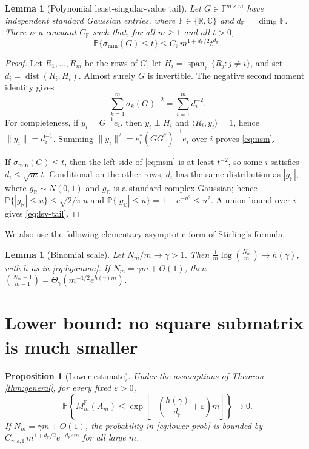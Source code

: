 \documentclass[preprint,12pt]{elsarticle}
\newtheorem{proposition}[theorem]{Proposition}
\newtheorem{lemma}[theorem]{Lemma}
\DeclareMathOperator{\dist}{dist}
\newcommand{\R}{\mathbb{R}}
\newcommand{\C}{\mathbb{C}}
\newcommand{\F}{\mathbb{F}}
\newcommand{\PP}{\mathbb{P}}
\begin{document}
\begin{lemma}[Polynomial least-singular-value tail]\label{lem:lsv-tail}
Let $G\in\F^{m\times m}$ have independent standard Gaussian entries, where $\F\in\{\R,\C\}$ and
$d_\F=\dim_\R\F$. There is a constant $C_\F$ such that, for all $m\ge1$ and all $t>0$,
\begin{equation}\label{eq:lsv-tail}
  \PP\{\sigma_{\min}(G)\le t\}\le C_\F m^{1+d_\F/2}t^{d_\F}.
\end{equation}
\end{lemma}

\begin{proof}
Let $R_1,\ldots,R_m$ be the rows of $G$, let $H_i=\operatorname{span}_\F\{R_j:j\ne i\}$, and set
$d_i=\dist(R_i,H_i)$. Almost surely $G$ is invertible. The negative second moment identity gives
\begin{equation}\label{eq:nsm}
  \sum_{k=1}^m \sigma_k(G)^{-2}=\sum_{i=1}^m d_i^{-2}.
\end{equation}
For completeness, if $y_i=G^{-1}e_i$, then $y_i\perp H_i$ and $\langle R_i,y_i\rangle=1$, hence
$\|y_i\|=d_i^{-1}$. Summing $\|y_i\|^2=e_i^*(GG^*)^{-1}e_i$ over $i$ proves \eqref{eq:nsm}.

If $\sigma_{\min}(G)\le t$, then the left side of \eqref{eq:nsm} is at least $t^{-2}$, so some $i$
satisfies $d_i\le \sqrt m\,t$. Conditional on the other rows, $d_i$ has the same distribution as
$|g_\F|$, where $g_\R\sim N(0,1)$ and $g_\C$ is a standard complex Gaussian; hence
$\PP\{|g_\R|\le u\}\le \sqrt{2/\pi}\,u$ and $\PP\{|g_\C|\le u\}=1-e^{-u^2}\le u^2$. A union bound over
$i$ gives \eqref{eq:lsv-tail}.
\end{proof}

We also use the following elementary asymptotic form of Stirling's formula.

\begin{lemma}[Binomial scale]\label{lem:binomial}
Let $N_m/m\to\gamma>1$. Then $\frac1m\log \binom{N_m}{m}\to h(\gamma)$, with $h$ as in
\eqref{eq:hgamma}. If $N_m=\gamma m+O(1)$, then
$\binom{N_m-1}{m-1}=\Theta_\gamma(m^{-1/2}e^{h(\gamma)m})$.
\end{lemma}

\section{Lower bound: no square submatrix is much smaller}

\begin{proposition}[Lower estimate]\label{prop:lower}
Under the assumptions of Theorem \ref{thm:general}, for every fixed $\varepsilon>0$,
\begin{equation}\label{eq:lower-prob}
  \PP\left\{M_m^\F(A_m)\le \exp\left[-\left(\frac{h(\gamma)}{d_\F}+\varepsilon\right)m\right]\right\}\to0.
\end{equation}
If $N_m=\gamma m+O(1)$, the probability in \eqref{eq:lower-prob} is bounded by
$C_{\gamma,\varepsilon,\F}m^{1+d_\F/2}e^{-d_\F\varepsilon m}$ for all large $m$.
\end{proposition}
\end{document}
